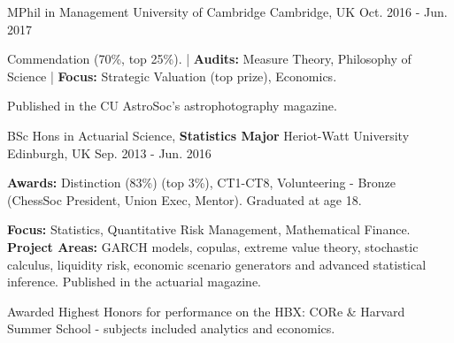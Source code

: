 

\begin{cventries}
  \cventry
    {MPhil in Management} %
    {University of Cambridge} %
    {Cambridge, UK} %
    {Oct. 2016 - Jun. 2017} %
    {
      \begin{cvitems} %
        \item {Commendation (70\%, top 25\%). | \textbf{Audits:} Measure Theory, Philosophy of Science | \textbf{Focus:} Strategic Valuation (top prize), Economics.}
        \item {Published in the CU AstroSoc's astrophotography magazine.}
      \end{cvitems}
    }

  \cventry
    {BSc Hons in Actuarial Science, \textbf{Statistics Major}} %
    {Heriot-Watt University} %
    {Edinburgh, UK} %
    {Sep. 2013 - Jun. 2016} %
    {
      \begin{cvitems} %
        \item {\textbf{Awards:} Distinction (83\%) (top 3\%), CT1-CT8, Volunteering - Bronze (ChessSoc President, Union Exec, Mentor). Graduated at age 18.}
        \item {\textbf{Focus:} Statistics, Quantitative Risk Management, Mathematical Finance. \textbf{Project Areas:} GARCH models, copulas, extreme value theory, stochastic calculus, liquidity risk, economic scenario generators and advanced statistical inference. Published in the actuarial magazine.}
        \item {Awarded Highest Honors for performance on the HBX: CORe \& Harvard Summer School - subjects included analytics and economics.}
      \end{cvitems}
    }

\end{cventries}
